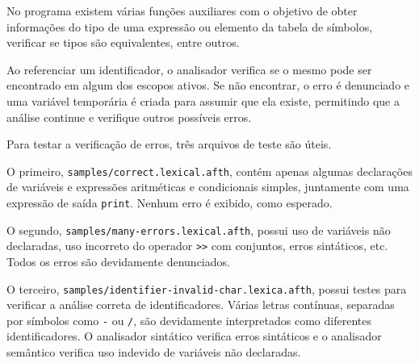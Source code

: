 \documentclass[
	article,			%
	11pt,				%
	oneside,			%
	a4paper,			%
	english,			%
	brazil,				%
	sumario=tradicional
	]{abntex2}
\begin{document}
No programa existem várias funções auxiliares com o objetivo de obter informações do tipo de uma expressão ou elemento da tabela de símbolos, verificar se tipos são equivalentes, entre outros.

Ao referenciar um identificador, o analisador verifica se o mesmo pode ser encontrado em algum dos escopos ativos. Se não encontrar, o erro é denunciado e uma variável temporária é criada para assumir que ela existe, permitindo que a análise continue e verifique outros possíveis erros.

Para testar a verificação de erros, três arquivos de teste são úteis.

O primeiro, \texttt{samples/correct.lexical.afth}, contém apenas
algumas declarações de variáveis e expressões aritméticas e condicionais
simples, juntamente com uma expressão de saída \texttt{print}. Nenhum erro é exibido, como esperado.

O segundo, \texttt{samples/many-errors.lexical.afth}, possui uso de variáveis não declaradas, uso incorreto do operador \texttt{>>} com conjuntos, erros sintáticos, etc. Todos os erros são devidamente denunciados.

O terceiro, \texttt{samples/identifier-invalid-char.lexica.afth}, possui
testes para verificar a análise correta de identificadores. Várias letras
contínuas, separadas por símbolos como \texttt{-} ou \texttt{/}, são
devidamente interpretados como diferentes identificadores. O analisador sintático verifica erros sintáticos e o analisador semântico verifica uso indevido de variáveis não declaradas.

\postextual



%
%


\end{document}

